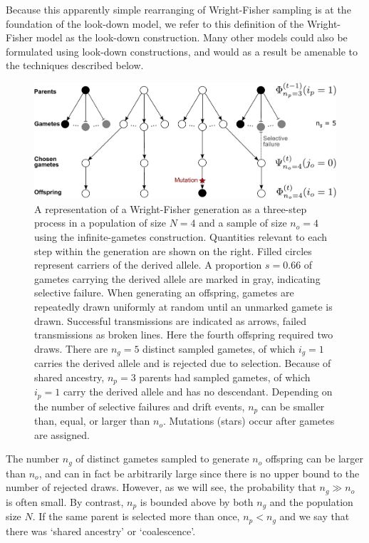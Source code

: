\documentclass[9pt,twocolumn,twoside,lineno]{gsajnl}
\begin{document}
Because this apparently simple rearranging of Wright-Fisher sampling is at the foundation of the look-down model, we refer to this definition of the Wright-Fisher model as the look-down construction. Many other models could also be formulated using look-down constructions, and would as a result be amenable to the techniques described below.   
 \begin{figure}
  \centering
  \includegraphics[width=\columnwidth]{fig/WF_schematic.pdf}

 \caption{\label{fig_schematic_gametes}
 A representation of a Wright-Fisher generation as a three-step process in a population of size $N=4$ and a sample of size $n_o=4$ using the infinite-gametes  construction. Quantities relevant to each step within the generation are shown on the right.  Filled circles represent carriers of the derived allele. A proportion $s=0.66$ of gametes carrying the derived allele are marked in gray, indicating selective failure. When generating an offspring, gametes are repeatedly drawn uniformly at random until an unmarked gamete is drawn. 
Successful transmissions are indicated as arrows, failed transmissions as broken lines.   
   Here the fourth offspring required two draws. There are $n_g=5$ distinct sampled gametes, of which $i_g=1$ carries the derived allele and is rejected due to selection. Because of shared ancestry, $n_p=3$ parents had sampled gametes, of which  $i_p=1$ carry the derived allele and has no descendant.  Depending on the number of selective failures and drift events, $n_p$ can be smaller than, equal, or larger than $n_o$.  Mutations (stars) occur after gametes are assigned.}
\end{figure}
 
The number $n_g$ of distinct gametes sampled to generate $n_o$ offspring can be larger than $n_o$, and can in fact be arbitrarily large since there is no upper bound to the number of rejected draws. However, as we will see, the probability that $n_g \gg n_o$ is often small. 
By contrast, $n_p$ is bounded above by both $n_g$ and the population size $N$. If the same parent is selected more than once, $n_p< n_g$ and we say that there was `shared ancestry' or `coalescence'. 
\end{document}
